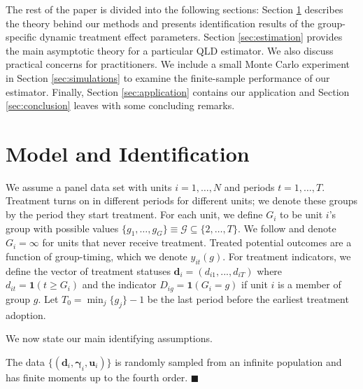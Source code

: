 \documentclass[12pt]{article}
\begin{document}
The rest of the paper is divided into the following sections: Section \ref{sec:theory} describes the theory behind our methods and presents identification results of the group-specific dynamic treatment effect parameters. Section \ref{sec:estimation} provides the main asymptotic theory for a particular QLD estimator. We also discuss practical concerns for practitioners. We include a small Monte Carlo experiment in Section \ref{sec:simulations} to examine the finite-sample performance of our estimator. Finally, Section \ref{sec:application} contains our application and Section \ref{sec:conclusion} leaves with some concluding remarks. 


\section{Model and Identification} \label{sec:theory}

We assume a panel data set with units $i = 1,\dots, N$ and periods $t = 1, \dots, T$. Treatment turns on in different periods for different units; we denote these groups by the period they start treatment. For each unit, we define $G_i$ to be unit $i$'s group with possible values $\{ g_1, \dots, g_G \} \equiv \mathcal{G} \subseteq \{ 2, \dots, T \}$. We follow \citet{Callaway_Santanna_2021} and denote $G_i = \infty$ for units that never receive treatment. Treated potential outcomes are a function of group-timing, which we denote $y_{it}(g)$. For treatment indicators, we define the vector of treatment statuses $\bm d_{i} = (d_{i1},...,d_{iT})$ where $d_{it} = \mathbf{1}(t \geq G_i)$ and the indicator $D_{ig} = \mathbf{1}(G_i = g)$ if unit $i$ is a member of group $g$. Let $T_0 = \min_j \{ g_j \} - 1$ be the last period before the earliest treatment adoption. 


We now state our main identifying assumptions.

\begin{assumption}\label{asm:sampling}
The data $\{ (\bm d_i, \bm \gamma_i, \bm u_i) \}$ is randomly sampled from an infinite population and has finite moments up to the fourth order. $\blacksquare$
\end{assumption}
\end{document}
